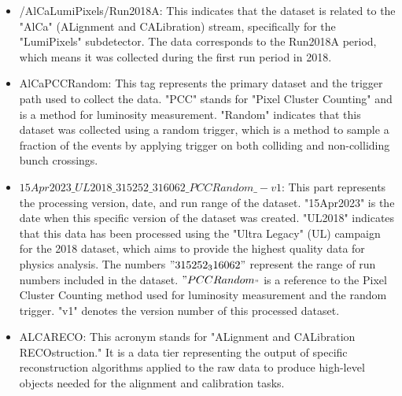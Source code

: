 \begin{itemize}

\item /AlCaLumiPixels/Run2018A: This indicates that the dataset is related to the "AlCa" (ALignment and CALibration) stream, specifically for the "LumiPixels" subdetector. The data corresponds to the Run2018A period, which means it was collected during the first run period in 2018.

\item AlCaPCCRandom: This tag represents the primary dataset and the trigger path used to collect the data. "PCC" stands for "Pixel Cluster Counting" and is a method for luminosity measurement. "Random" indicates that this dataset was collected using a random trigger, which is a method to sample a fraction of the events by applying trigger on both colliding and non-colliding bunch crossings.

\item $15Apr2023\_UL2018\_315252\_316062\_PCCRandom\_-v1$: This part represents the processing version, date, and run range of the dataset. "15Apr2023" is the date when this specific version of the dataset was created. "UL2018" indicates that this data has been processed using the "Ultra Legacy" (UL) campaign for the 2018 dataset, which aims to provide the highest quality data for physics analysis. The numbers $"315252_316062"$ represent the range of run numbers included in the dataset. $"PCCRandom_"$ is a reference to the Pixel Cluster Counting method used for luminosity measurement and the random trigger. "v1" denotes the version number of this processed dataset.

\item ALCARECO:
This acronym stands for "ALignment and CALibration RECOstruction." It is a data tier representing the output of specific reconstruction algorithms applied to the raw data to produce high-level objects needed for the alignment and calibration tasks.

\end{itemize}




